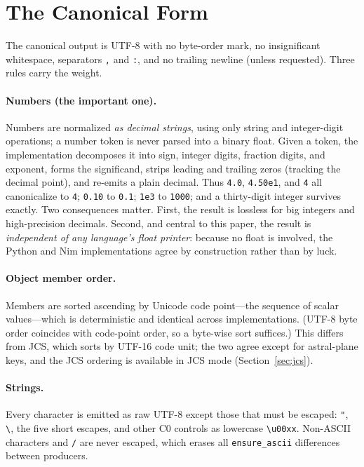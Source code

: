 \documentclass[11pt]{article}
\newcommand{\code}[1]{\texttt{#1}}
\begin{document}
\section{The Canonical Form}\label{sec:spec}

The canonical output is UTF-8 with no byte-order mark, no insignificant
whitespace, separators \code{,} and \code{:}, and no trailing newline (unless
requested). Three rules carry the weight.

\paragraph{Numbers (the important one).}
Numbers are normalized \emph{as decimal strings}, using only string and
integer-digit operations; a number token is never parsed into a binary float.
Given a token, the implementation decomposes it into sign, integer digits,
fraction digits, and exponent, forms the significand, strips leading and
trailing zeros (tracking the decimal point), and re-emits a plain decimal. Thus
\code{4.0}, \code{4.50e1}, and \code{4} all canonicalize to \code{4};
\code{0.10} to \code{0.1}; \code{1e3} to \code{1000}; and a thirty-digit
integer survives exactly. Two consequences matter. First, the result is
lossless for big integers and high-precision decimals. Second, and central to
this paper, the result is \emph{independent of any language's float printer}:
because no float is involved, the Python and Nim implementations agree by
construction rather than by luck.

\paragraph{Object member order.}
Members are sorted ascending by Unicode code point---the sequence of scalar
values---which is deterministic and identical across implementations. (UTF-8
byte order coincides with code-point order, so a byte-wise sort suffices.) This
differs from JCS, which sorts by UTF-16 code unit; the two agree except for
astral-plane keys, and the JCS ordering is available in JCS mode
(Section~\ref{sec:jcs}).

\paragraph{Strings.}
Every character is emitted as raw UTF-8 except those that must be escaped:
\code{"}, \code{\textbackslash}, the five short escapes, and other C0 controls
as lowercase \code{\textbackslash u00xx}. Non-ASCII characters and \code{/} are
never escaped, which erases all \code{ensure\_ascii} differences between
producers.
\end{document}
